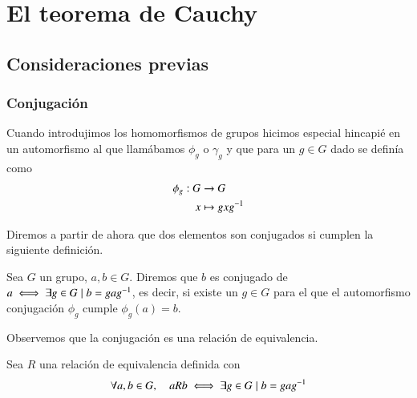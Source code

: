 
\chapter{El teorema de Cauchy}

\section{Consideraciones previas}

\subsection{Conjugación}

Cuando introdujimos los homomorfismos de grupos hicimos especial hincapié en un automorfismo al que llamábamos $\phi_g$ o $\gamma_g$ y que para un $g \in G$ dado se definía como
\begin{align*}
	\phi_g : G &\to G\\
			x &\mapsto gxg^{-1}
\end{align*}

Diremos a partir de ahora que dos elementos son conjugados si cumplen la siguiente definición.

\begin{dfn}[Conjugados]
	\label{dfn:elementosconjugados}
	Sea $G$ un grupo, $a,b \in G$. Diremos que $b$ es conjugado de $a \iff \exists g \in G \mid b = gag^{-1}$, es decir, si existe un $g\in G$ para el que el automorfismo conjugación $\phi_g$ cumple $\phi_g(a) = b$.
\end{dfn}

Observemos que la conjugación es una relación de equivalencia.

\begin{pro}
	Sea $R$ una relación de equivalencia definida con
	\begin{align*}
		\forall a,b \in G,\quad aRb \iff \exists g \in G \mid b = gag^{-1}
	\end{align*}
\end{pro}

